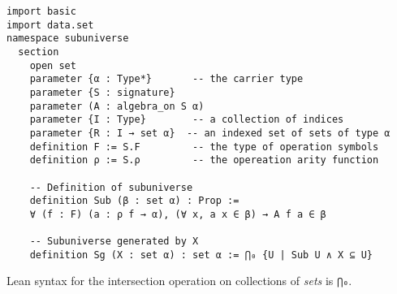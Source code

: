 \documentclass[11pt]{amsart}  %
\begin{document}
\begin{lstlisting}
import basic
import data.set
namespace subuniverse
  section
    open set
    parameter {α : Type*}       -- the carrier type 
    parameter {S : signature}
    parameter (A : algebra_on S α) 
    parameter {I : Type}        -- a collection of indices
    parameter {R : I → set α}  -- an indexed set of sets of type α
    definition F := S.F         -- the type of operation symbols
    definition ρ := S.ρ         -- the opereation arity function

    -- Definition of subuniverse
    definition Sub (β : set α) : Prop :=
    ∀ (f : F) (a : ρ f → α), (∀ x, a x ∈ β) → A f a ∈ β
  
    -- Subuniverse generated by X
    definition Sg (X : set α) : set α := ⋂₀ {U | Sub U ∧ X ⊆ U}
\end{lstlisting}  
Lean syntax for the intersection operation on collections of \emph{sets} is 
\lstinline{⋂₀}.
\end{document}
